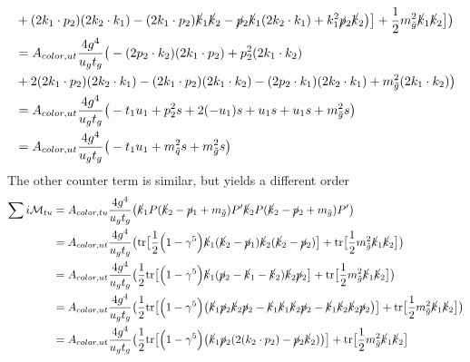 \documentclass[11pt]{article}
\begin{document}
\begin{flushleft}
\begin{align*}
&  + (2k_1 \cdot p_2)(2k_2 \cdot k_1) - (2k_1 \cdot p_2)\cancel{k}_1\cancel{k}_2 - \cancel{p}_2 \cancel{k}_1(2k_2 \cdot k_1) + k_1^2\cancel{p}_2 \cancel{k}_2 \big) \big] + \frac{1}{2} m_{\tilde{g}}^2 \cancel{k}_1  \cancel{k}_2\big]
  \big)\\
  &=  A_{color, ut} \frac{4 g^4}{u_gt_g} \big(
  -   (2 p_2 \cdot k_2)(2k_1 \cdot p_2) + p_2^2  (2k_1 \cdot k_2) \\
&  + 2(2k_1 \cdot p_2)(2k_2 \cdot k_1) - (2k_1 \cdot p_2)(2k_1 \cdot k_2) - (2 p_2 \cdot k_1)(2k_2 \cdot k_1) 
+  m_{\tilde{g}}^2 (2k_1 \cdot k_2) 
  \big)\\
&=  A_{color, ut} \frac{4 g^4}{u_gt_g} \big(
  -   t_1 u_1 + p_2^2  s  + 2(-u_1)s + u_1s +u_1s 
+  m_{\tilde{g}}^2 s
  \big)\\
  &=  A_{color, ut} \frac{4 g^4}{u_gt_g} \big(
  -   t_1 u_1 + m_{\tilde{q}}^2 s 
+  m_{\tilde{g}}^2 s
  \big)\\
\end{align*}
The other counter term is similar, but yields a different order
\begin{align*}
\sum i \mathcal{M}_{tu} &= A_{color, tu} \frac{4 g^4}{u_gt_g}\big( \cancel{k}_1   P (\cancel{k}_2 - \cancel{p}_1 + m_{\tilde{g}}) P'\cancel{k}_2  P (\cancel{k}_2 -\cancel{p}_2 + m_{\tilde{g}}) P' \big)\\
&= A_{color, ut} \frac{4 g^4}{u_gt_g} \big(
 \text{tr} \big[ \frac{1}{2}\Big(1 - \gamma^5 \Big) \cancel{k}_1 (\cancel{k}_2 - \cancel{p}_1) \cancel{k}_2(\cancel{k}_2-\cancel{p}_2) \big] + \text{tr} \big[\frac{1}{2} m_{\tilde{g}}^2 \cancel{k}_1  \cancel{k}_2\big]
  \big)\\
  &= A_{color, ut} \frac{4 g^4}{u_gt_g} \big(
 \frac{1}{2} \text{tr} \big[\Big(1 - \gamma^5 \Big) \cancel{k}_1 (\cancel{p}_2 - \cancel{k}_1 - \cancel{k}_2) \cancel{k}_2\cancel{p}_2  \big] + \text{tr} \big[\frac{1}{2} m_{\tilde{g}}^2 \cancel{k}_1  \cancel{k}_2\big]
  \big)\\
  &= A_{color, ut} \frac{4 g^4}{u_gt_g} \big(
 \frac{1}{2} \text{tr} \big[\Big(1 - \gamma^5 \Big) \big( \cancel{k}_1 \cancel{p}_2 \cancel{k}_2\cancel{p}_2 - \cancel{k}_1\cancel{k}_1 \cancel{k}_2\cancel{p}_2 - \cancel{k}_1 \cancel{k}_2 \cancel{k}_2\cancel{p}_2  \big)\big] + \text{tr} \big[\frac{1}{2} m_{\tilde{g}}^2 \cancel{k}_1  \cancel{k}_2\big]
  \big)\\
  &= A_{color, ut} \frac{4 g^4}{u_gt_g} \big(
 \frac{1}{2} \text{tr} \big[\Big(1 - \gamma^5 \Big) \big( \cancel{k}_1 \cancel{p}_2 (2 (k_2 \cdot p_2)- \cancel{p}_2\cancel{k}_2)  \big)\big] + \text{tr} \big[\frac{1}{2} m_{\tilde{g}}^2 \cancel{k}_1  \cancel{k}_2\big]

\end{align*}
\end{flushleft}
\end{document}
